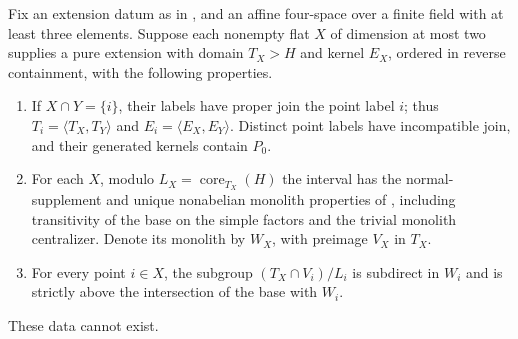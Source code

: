 \begin{lemma}\label{f:lem-lower-grid}
Fix an extension datum as in , and an affine
four-space over a finite field with at least three elements. Suppose each nonempty
flat $X$ of dimension at most two supplies a pure extension with domain
$T_X>H$ and kernel $E_X$, ordered in reverse containment, with the following
properties.
\begin{enumerate}[label=\textup{(\roman*)}]
\item If $X\cap Y=\{i\}$, their labels have proper join the point label $i$;
thus $T_i=\langle T_X,T_Y\rangle$ and
$E_i=\langle E_X,E_Y\rangle$. Distinct point labels have incompatible
join, and their generated kernels contain $P_0$.
\item For each $X$, modulo $L_X=\operatorname{core}_{T_X}(H)$ the interval
has the normal-supplement and unique nonabelian monolith properties of
, including transitivity of the base on the simple
factors and the trivial monolith centralizer. Denote
its monolith by $W_X$, with preimage $V_X$ in $T_X$.
\item For every point $i\in X$, the subgroup
$(T_X\cap V_i)/L_i$ is subdirect in $W_i$ and is strictly above the
intersection of the base with $W_i$.
\end{enumerate}
These data cannot exist.
\end{lemma}
